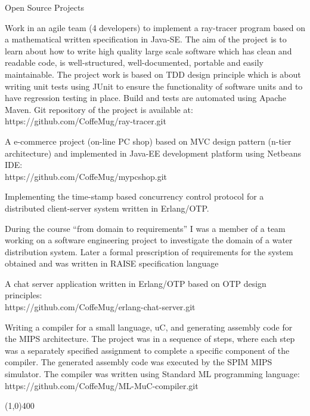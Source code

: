 \documentclass{resume}
\begin{document}
\begin{category}{Open Source Projects}

\citembullet
Work in an agile team (4 developers) to implement a ray-tracer program based on 
a mathematical written specification in Java-SE.
The aim of the project is to learn about how to write high quality large scale software 
which has clean and readable code, is well-structured, well-documented, portable and 
easily maintainable. The project work is based on TDD design principle 
which is about writing unit tests using JUnit to ensure the functionality of 
software units and to have regression testing in place. Build and tests are automated 
using Apache Maven. 
Git repository of the project is available at:
https://github.com/CoffeMug/ray-tracer.git

\citembullet A e-commerce project (on-line PC shop) based on MVC design 
pattern (n-tier architecture) and implemented in Java-EE development platform 
using Netbeans IDE:\\
https://github.com/CoffeMug/mypcshop.git

\citembullet
Implementing the time-stamp based concurrency control protocol for a 
distributed client-server system written in Erlang/OTP.

\citembullet
During the course ``from domain to requirements'' I was a member of a team 
working on a software engineering project to investigate the domain of a 
water distribution system. 
Later a formal prescription of requirements for the system obtained 
and was written in RAISE specification language

\citembullet
A chat server application written in Erlang/OTP based on OTP design principles:\\
https://github.com/CoffeMug/erlang-chat-server.git


\citembullet Writing a compiler for a small language, uC, and generating assembly 
code for the MIPS architecture.
The project was in a sequence of steps, where each step was a separately specified 
assignment to complete a specific component of the compiler.
The generated assembly code was executed by the SPIM MIPS simulator. 
The compiler was written using Standard ML programming language:
https://github.com/CoffeMug/ML-MuC-compiler.git

\end{category}

\begin{center}
\line(1,0){400}
\end{center}
\end{document}
